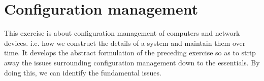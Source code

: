 \documentclass{book}
\begin{document}
\begin{solution}
\end{solution}





\chapter{Configuration management}

This exercise is about configuration management of computers and
network devices. i.e. how we construct the details of a system
and maintain them over time. It develops the abstract formulation of
the preceding exercise so as to strip away the issues surrounding
configuration management down to the essentials. By doing this, we can 
identify the fundamental issues.
\end{document}
